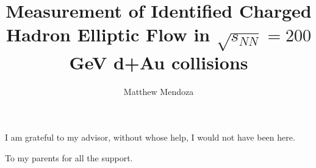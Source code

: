 \documentclass[oneside,final, letterpaper]{ucr}
\begin{document}

\title{Measurement of Identified Charged Hadron Elliptic Flow in $\sqrt{s_{NN}}=200$ GeV d+Au collisions}
\author{Matthew Mendoza}

\maketitle
\copyrightpage{}
\approvalpage{}


\begin{frontmatter}

\begin{acknowledgements}
I am grateful to my advisor, without whose help, I would not have been here.
\end{acknowledgements}

\begin{dedication}
\null\vfil
{\large
\begin{center}
To my parents for all the support.
\end{center}}
\vfil\null
\end{dedication}



\tableofcontents
\listoffigures
\listoftables
\end{frontmatter}

\dsp















\nocite{*}
%
\ssp
 
 
\end{document}

